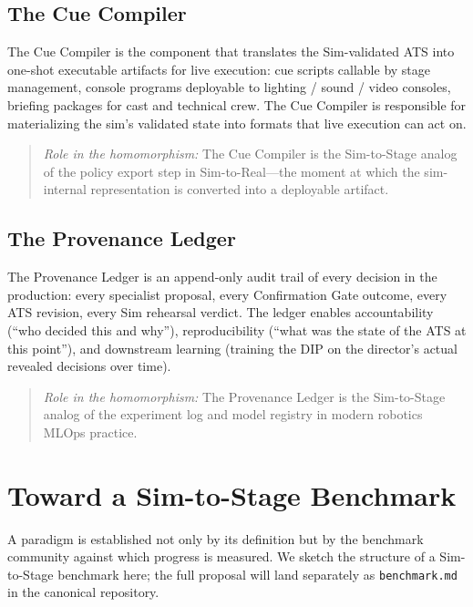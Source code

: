 \documentclass[11pt]{article}
\begin{document}
\subsection{The Cue Compiler}
\label{sec:compiler}

The Cue Compiler is the component that translates the Sim-validated ATS
into one-shot executable artifacts for live execution: cue scripts callable
by stage management, console programs deployable to lighting / sound /
video consoles, briefing packages for cast and technical crew.  The Cue
Compiler is responsible for materializing the sim's validated state into
formats that live execution can act on.

\begin{quote}
\textit{Role in the homomorphism:} The Cue Compiler is the Sim-to-Stage
analog of the policy export step in Sim-to-Real---the moment at which the
sim-internal representation is converted into a deployable artifact.
\end{quote}

\subsection{The Provenance Ledger}
\label{sec:provenance}

The Provenance Ledger is an append-only audit trail of every decision in
the production: every specialist proposal, every Confirmation Gate outcome,
every ATS revision, every Sim rehearsal verdict.  The ledger enables
accountability (``who decided this and why''), reproducibility (``what was
the state of the ATS at this point''), and downstream learning (training
the DIP on the director's actual revealed decisions over time).

\begin{quote}
\textit{Role in the homomorphism:} The Provenance Ledger is the
Sim-to-Stage analog of the experiment log and model registry in modern
robotics MLOps practice.
\end{quote}

\section{Toward a Sim-to-Stage Benchmark}

A paradigm is established not only by its definition but by the benchmark
community against which progress is measured.  We sketch the structure of a
Sim-to-Stage benchmark here; the full proposal will land separately as
\texttt{benchmark.md} in the canonical repository.
\end{document}
